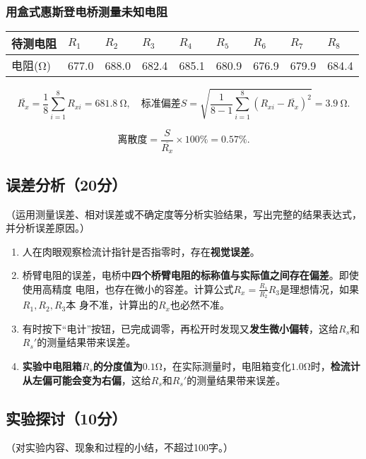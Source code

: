 \documentclass{../template/Report}%
\begin{document}
\begin{fullreportonly}
\subsubsection{用盒式惠斯登电桥测量未知电阻}
\begin{table}[H]
    \centering
    \begin{tabular}{|C{0.1\textwidth}|C{0.08\textwidth}|C{0.08\textwidth}|C{0.08\textwidth}|C{0.08\textwidth}|C{0.08\textwidth}|C{0.08\textwidth}|C{0.08\textwidth}|C{0.08\textwidth}|}
        \hline
        待测电阻 & $R_1$ & $R_2$ & $R_3$ & $R_4$ & $R_5$ & $R_6$ & $R_7$ & $R_8$ \\
        \hline
        电阻(\si{\ohm}) & 677.0 & 688.0 & 682.4 & 685.1 & 680.9 & 676.9 & 679.9 & 684.4 \\
        \hline
    \end{tabular}
\end{table}

\[
    \overline{R_x} = \frac{1}{8}\sum_{i=1}^{8} R_{xi} = \SI{681.8}{\ohm}, \quad \text{标准偏差} S = \sqrt{\frac{1}{8-1}\sum_{i=1}^{8}(R_{xi} - \overline{R_x})^2} = \SI{3.9}{\ohm}
.\]

\[
    \text{离散度} = \frac{S}{\overline{R_x}} \times 100\% = 0.57\%
.\]

\subsection{误差分析（20分）}
（运用测量误差、相对误差或不确定度等分析实验结果，写出完整的结果表达式，并分析误差原因。）
\begin{enumerate}
    \item  人在肉眼观察检流计指针是否指零时，存在\textbf{视觉误差}。
    \item 桥臂电阻的误差，电桥中\textbf{四个桥臂电阻的标称值与实际值之间存在偏差}。即使使用高精度
        电阻，也存在微小的容差。计算公式$R_x = \frac{R_1}{R_2} R_3$是理想情况，如果$R_1, R_2, R_3$本
        身不准，计算出的$R_x$也必然不准。
    \item 有时按下“电计”按钮，已完成调零，再松开时发现又\textbf{发生微小偏转}，这给$R_s$和$R_s'$的测量结果带来误差。
    \item \textbf{实验中电阻箱$R_s$的分度值为$0.1\si{\ohm}$}，在实际测量时，电阻箱变化$1.0\si{\ohm}$时，\textbf{检流计从左偏可能会变为右偏}，这给$R_s$和$R_s'$的测量结果带来误差。
\end{enumerate}
\subsection{实验探讨（10分）}
（对实验内容、现象和过程的小结，不超过100字。）


\end{fullreportonly}
\end{document}
